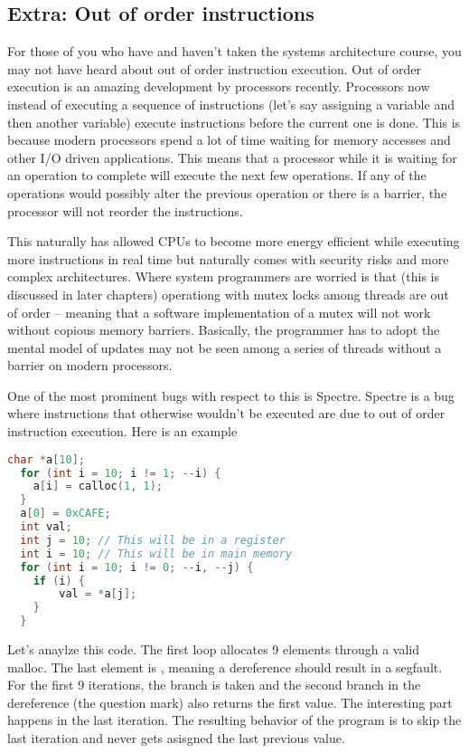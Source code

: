 \subsection{Extra: Out of order instructions}

For those of you who have and haven't taken the systems architecture course, you may not have heard about out of order instruction execution.
Out of order execution is an amazing development by processors recently.
Processors now instead of executing a sequence of instructions (let's say assigning a variable and then another variable) execute instructions before the current one is done.
This is because modern processors spend a lot of time waiting for memory accesses and other I/O driven applications.
This means that a processor while it is waiting for an operation to complete will execute the next few operations.
If any of the operations would possibly alter the previous operation or there is a barrier, the processor will not reorder the instructions.

This naturally has allowed CPUs to become more energy efficient while executing more instructions in real time but naturally comes with security risks and more complex architectures.
Where system programmers are worried is that (this is discussed in later chapters) operationg with mutex locks among threads are out of order -- meaning that a software implementation of a mutex will not work without copious memory barriers.
Basically, the programmer has to adopt the mental model of updates may not be seen among a series of threads without a barrier on modern processors.

One of the most prominent bugs with respect to this is Spectre.
Spectre is a bug where instructions that otherwise wouldn't be executed are due to out of order instruction execution.
Here is an example
\begin{lstlisting}[language=C]
  char *a[10]; 
  for (int i = 10; i != 1; --i) {
    a[i] = calloc(1, 1);
  }
  a[0] = 0xCAFE;
  int val;
  int j = 10; // This will be in a register
  int i = 10; // This will be in main memory
  for (int i = 10; i != 0; --i, --j) {
    if (i) {
        val = *a[j];
    }
  }
\end{lstlisting}

Let's anaylze this code.
The first loop allocates 9 elements through a valid malloc.
The last element is , meaning a dereference should result in a segfault.
For the first 9 iterations, the branch is taken and the second branch in the dereference (the question mark) also returns the first value.
The interesting part happens in the last iteration.
The resulting behavior of the program is to skip the last iteration and  never gets asisgned the last previous value.

